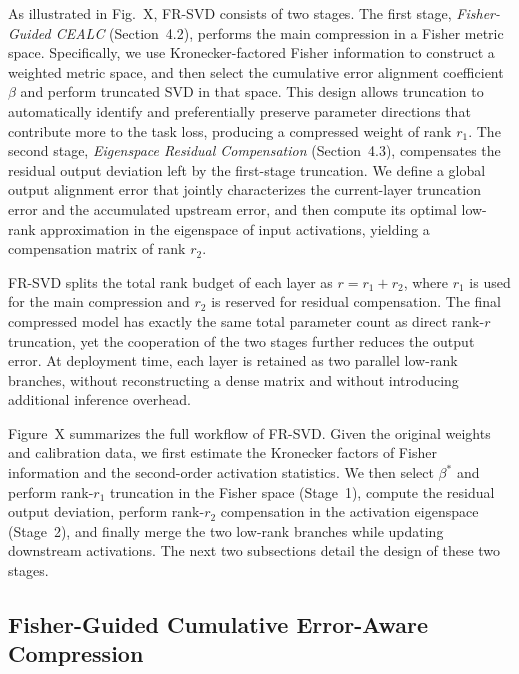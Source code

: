 \documentclass[a4paper,fleqn]{cas-dc}
\begin{document}
As illustrated in Fig.~X, FR-SVD consists of two stages. The first stage, \emph{Fisher-Guided CEALC} (Section~4.2), performs the main compression in a Fisher metric space. Specifically, we use Kronecker-factored Fisher information to construct a weighted metric space, and then select the cumulative error alignment coefficient $\beta$ and perform truncated SVD in that space. This design allows truncation to automatically identify and preferentially preserve parameter directions that contribute more to the task loss, producing a compressed weight of rank $r_1$. The second stage, \emph{Eigenspace Residual Compensation} (Section~4.3), compensates the residual output deviation left by the first-stage truncation. We define a global output alignment error that jointly characterizes the current-layer truncation error and the accumulated upstream error, and then compute its optimal low-rank approximation in the eigenspace of input activations, yielding a compensation matrix of rank $r_2$.

FR-SVD splits the total rank budget of each layer as $r = r_1 + r_2$, where $r_1$ is used for the main compression and $r_2$ is reserved for residual compensation. The final compressed model has exactly the same total parameter count as direct rank-$r$ truncation, yet the cooperation of the two stages further reduces the output error. At deployment time, each layer is retained as two parallel low-rank branches, without reconstructing a dense matrix and without introducing additional inference overhead.

Figure~X summarizes the full workflow of FR-SVD. Given the original weights and calibration data, we first estimate the Kronecker factors of Fisher information and the second-order activation statistics. We then select $\beta^*$ and perform rank-$r_1$ truncation in the Fisher space (Stage~1), compute the residual output deviation, perform rank-$r_2$ compensation in the activation eigenspace (Stage~2), and finally merge the two low-rank branches while updating downstream activations. The next two subsections detail the design of these two stages.

\subsection{Fisher-Guided Cumulative Error-Aware Compression}
\end{document}
